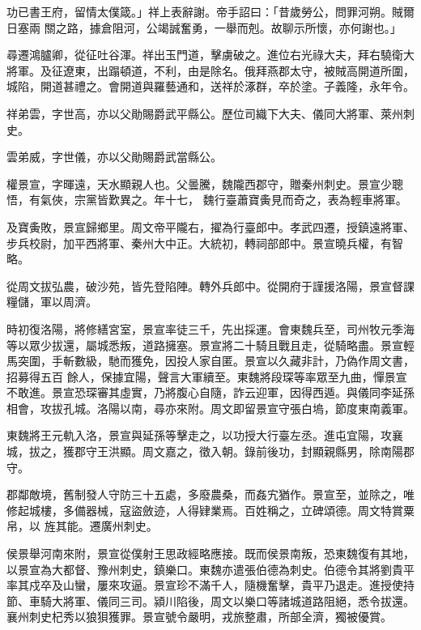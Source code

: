 \begin{pinyinscope}
 功已書王府，留情太僕箴。」祥上表辭謝。帝手詔曰：「昔歲勞公，問罪河朔。賊爾日塞兩
 關之路，據倉阻河，公竭誠奮勇，一舉而剋。故聊示所懷，亦何謝也。」



 尋遷鴻臚卿，從征吐谷渾。祥出玉門道，擊虜破之。進位右光祿大夫，拜右驍衛大將軍。及征遼東，出蹋頓道，不利，由是除名。俄拜燕郡太守，被賊高開道所圍，城陷，開道甚禮之。會開道與羅藝通和，送祥於涿群，卒於塗。子義隆，永年令。



 祥弟雲，字世高，亦以父勛賜爵武平縣公。歷位司織下大夫、儀同大將軍、萊州刺史。



 雲弟威，字世儀，亦以父勛賜爵武當縣公。



 權景宣，字暉遠，天水顯親人也。父曇騰，魏隴西郡守，贈秦州刺史。景宣少聰悟，有氣俠，宗黨皆歎異之。年十七，
 魏行臺蕭寶夤見而奇之，表為輕車將軍。



 及寶夤敗，景宣歸鄉里。周文帝平隴右，擢為行臺郎中。孝武四遷，授鎮遠將軍、步兵校尉，加平西將軍、秦州大中正。大統初，轉祠部郎中。景宣曉兵權，有智略。



 從周文拔弘農，破沙苑，皆先登陷陣。轉外兵郎中。從開府于謹援洛陽，景宣督課糧儲，軍以周濟。



 時初復洛陽，將修繕宮室，景宣率徒三千，先出採運。會東魏兵至，司州牧元季海等以眾少拔還，屬城悉叛，道路擁塞。景宣將二十騎且戰且走，從騎略盡。景宣輕馬突圍，手斬數級，馳而獲免，因投人家自匿。景宣以久藏非計，乃偽作周文書，招募得五百
 餘人，保據宜陽，聲言大軍續至。東魏將段琛等率眾至九曲，憚景宣不敢進。景宣恐琛審其虛實，乃將腹心自隨，詐云迎軍，因得西遁。與儀同李延孫相會，攻拔孔城。洛陽以南，尋亦來附。周文即留景宣守張白塢，節度東南義軍。



 東魏將王元軌入洛，景宣與延孫等擊走之，以功授大行臺左丞。進屯宜陽，攻襄城，拔之，獲郡守王洪顯。周文嘉之，徵入朝。錄前後功，封顯親縣男，除南陽郡守。



 郡鄰敵境，舊制發人守防三十五處，多廢農桑，而姦宄猶作。景宣至，並除之，唯修起城樓，多備器械，寇盜斂迹，人得肄業焉。百姓稱之，立碑頌德。周文特賞粟帛，以
 旌其能。遷廣州刺史。



 侯景舉河南來附，景宣從僕射王思政經略應接。既而侯景南叛，恐東魏復有其地，以景宣為大都督、豫州刺史，鎮樂口。東魏亦遣張伯德為刺史。伯德令其將劉貴平率其戍卒及山蠻，屢來攻逼。景宣珍不滿千人，隨機奮擊，貴平乃退走。進授使持節、車騎大將軍、儀同三司。潁川陷後，周文以樂口等諸城道路阻絕，悉令拔還。襄州刺史杞秀以狼狽獲罪。景宣號令嚴明，戎旅整肅，所部全濟，獨被優賞。




\end{pinyinscope}
